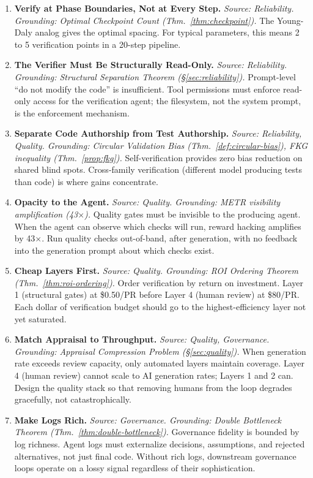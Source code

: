 \documentclass[11pt, a4paper, logo, copyright]{googledeepmind}
\begin{document}
\begin{enumerate}[label=\textbf{P\arabic*.}, leftmargin=3em]
\item \textbf{Verify at Phase Boundaries, Not at Every Step.}
\emph{Source: Reliability. Grounding: Optimal Checkpoint Count (Thm.~\ref{thm:checkpoint}).}
The Young-Daly analog gives the optimal spacing. For typical parameters, this means 2 to 5 verification points in a 20-step pipeline.

\item \textbf{The Verifier Must Be Structurally Read-Only.}
\emph{Source: Reliability. Grounding: Structural Separation Theorem (\S\ref{sec:reliability}).}
Prompt-level ``do not modify the code'' is insufficient. Tool permissions must enforce read-only access for the verification agent; the filesystem, not the system prompt, is the enforcement mechanism.

\item \textbf{Separate Code Authorship from Test Authorship.}
\emph{Source: Reliability, Quality. Grounding: Circular Validation Bias (Thm.~\ref{def:circular-bias}), FKG inequality (Thm.~\ref{prop:fkg}).}
Self-verification provides zero bias reduction on shared blind spots. Cross-family verification (different model producing tests than code) is where gains concentrate.

\item \textbf{Opacity to the Agent.}
\emph{Source: Quality. Grounding: METR visibility amplification (43$\times$).}
Quality gates must be invisible to the producing agent. When the agent can observe which checks will run, reward hacking amplifies by 43$\times$. Run quality checks out-of-band, after generation, with no feedback into the generation prompt about which checks exist.

\item \textbf{Cheap Layers First.}
\emph{Source: Quality. Grounding: ROI Ordering Theorem (Thm.~\ref{thm:roi-ordering}).}
Order verification by return on investment. Layer 1 (structural gates) at \$0.50/PR before Layer 4 (human review) at \$80/PR. Each dollar of verification budget should go to the highest-efficiency layer not yet saturated.

\item \textbf{Match Appraisal to Throughput.}
\emph{Source: Quality, Governance. Grounding: Appraisal Compression Problem (\S\ref{sec:quality}).}
When generation rate exceeds review capacity, only automated layers maintain coverage. Layer 4 (human review) cannot scale to AI generation rates; Layers 1 and 2 can. Design the quality stack so that removing humans from the loop degrades gracefully, not catastrophically.

\item \textbf{Make Logs Rich.}
\emph{Source: Governance. Grounding: Double Bottleneck Theorem (Thm.~\ref{thm:double-bottleneck}).}
Governance fidelity is bounded by log richness. Agent logs must externalize decisions, assumptions, and rejected alternatives, not just final code. Without rich logs, downstream governance loops operate on a lossy signal regardless of their sophistication.

\end{enumerate}
\end{document}
